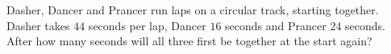 Dasher, Dancer and Prancer run laps on a circular track, starting together. Dasher takes $44$ seconds per lap, Dancer $16$ seconds and Prancer $24$ seconds. After how many seconds will all three first be together at the start again?

